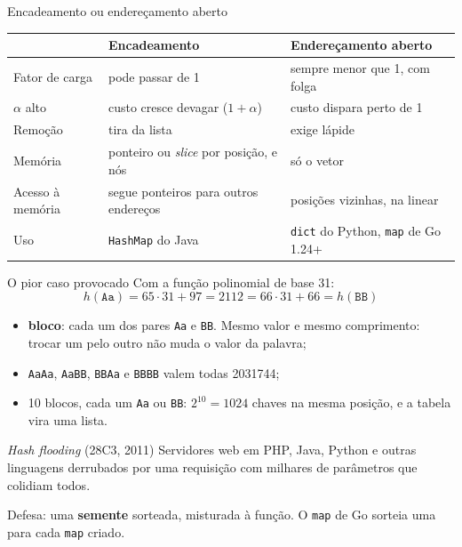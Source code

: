 \documentclass{beamer}
\begin{document}
\begin{frame}{Encadeamento ou endereçamento aberto}
	\begin{center}
		\scriptsize
		\begin{tabular}{>{\raggedright\arraybackslash}p{2.2cm}
			>{\raggedright\arraybackslash}p{3.6cm}
			>{\raggedright\arraybackslash}p{3.6cm}}
			\toprule
			                 & \textbf{Encadeamento}                        & \textbf{Endereçamento aberto}                     \\
			\midrule
			Fator de carga   & pode passar de 1                             & sempre menor que 1, com folga                     \\
			$\alpha$ alto    & custo cresce devagar ($1 + \alpha$)          & custo dispara perto de 1                          \\
			Remoção          & tira da lista                                & exige lápide                                      \\
			Memória          & ponteiro ou \emph{slice} por posição, e nós  & só o vetor                                        \\
			Acesso à memória & segue ponteiros para outros endereços        & posições vizinhas, na linear                      \\
			Uso              & \texttt{HashMap} do Java                     & \texttt{dict} do Python, \texttt{map} de Go 1.24+ \\
			\bottomrule
		\end{tabular}
	\end{center}
\end{frame}

\begin{frame}{O pior caso provocado}
	Com a função polinomial de base 31:
	\[
		h(\texttt{Aa}) = 65 \cdot 31 + 97 = 2112 = 66 \cdot 31 + 66 = h(\texttt{BB})
	\]

	\vspace{0.1cm}
	\begin{itemize}
		\item \textbf{bloco}: cada um dos pares \texttt{Aa} e \texttt{BB}. Mesmo valor
		      e mesmo comprimento: trocar um pelo outro não muda o valor da palavra;
		\item \texttt{AaAa}, \texttt{AaBB}, \texttt{BBAa} e \texttt{BBBB} valem
		      todas 2031744;
		\item 10 blocos, cada um \texttt{Aa} ou \texttt{BB}: $2^{10} = 1024$ chaves
		      na mesma posição, e a tabela vira uma lista.
	\end{itemize}

	\vspace{0.3cm}
	\begin{block}{\emph{Hash flooding} (28C3, 2011)}
		Servidores web em PHP, Java, Python e outras linguagens derrubados por uma
		requisição com milhares de parâmetros que colidiam todos.
	\end{block}

	\vspace{0.2cm}
	Defesa: uma \textbf{semente} sorteada, misturada à função. O \texttt{map} de Go
	sorteia uma para cada \texttt{map} criado.
\end{frame}
\end{document}
